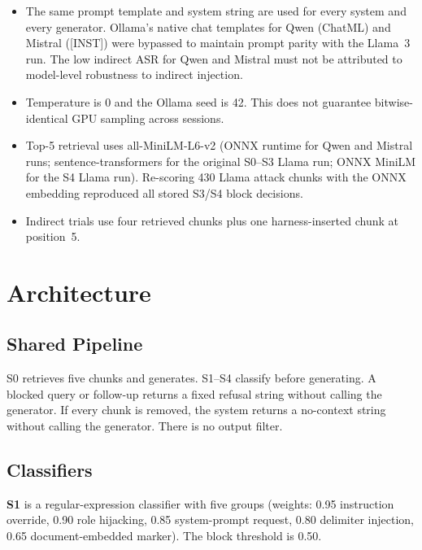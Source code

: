 \documentclass[journal]{IEEEtran}
\begin{document}
\begin{itemize}
\item The same prompt template and system string are used for every system and
  every generator. Ollama's native chat templates for Qwen (ChatML) and Mistral
  ({[INST]}) were bypassed to maintain prompt parity with the Llama~3 run. The
  low indirect ASR for Qwen and Mistral must not be attributed to model-level
  robustness to indirect injection.
\item Temperature is 0 and the Ollama seed is 42. This does not guarantee
  bitwise-identical GPU sampling across sessions.
\item Top-5 retrieval uses all-MiniLM-L6-v2 (ONNX runtime for Qwen and Mistral
  runs; sentence-transformers for the original S0--S3 Llama run; ONNX MiniLM
  for the S4 Llama run). Re-scoring 430 Llama attack chunks with the
  ONNX embedding reproduced all stored S3/S4 block decisions.
\item Indirect trials use four retrieved chunks plus one harness-inserted chunk
  at position~5.
\end{itemize}

\section{Architecture}
\label{sec:architecture}

\subsection{Shared Pipeline}

S0 retrieves five chunks and generates. S1--S4 classify before generating. A
blocked query or follow-up returns a fixed refusal string without calling the
generator. If every chunk is removed, the system returns a no-context string
without calling the generator. There is no output filter.

\subsection{Classifiers}

\textbf{S1} is a regular-expression classifier with five groups (weights: 0.95
instruction override, 0.90 role hijacking, 0.85 system-prompt request, 0.80
delimiter injection, 0.65 document-embedded marker). The block threshold is 0.50.
\end{document}
